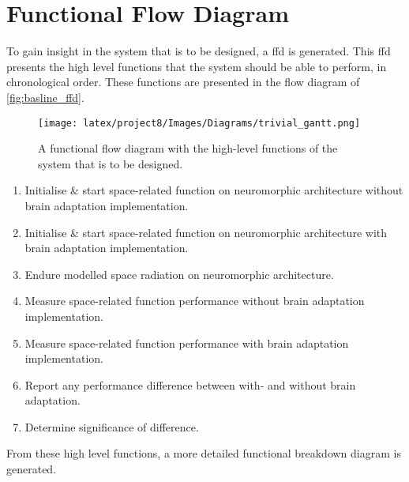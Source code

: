 \chapter{Functional Flow Diagram}\label{chap:baseline_ffd}
To gain insight in the system that is to be designed, a \acrlong{ffd} is generated. This \acrshort{ffd} presents the high level functions that the system should be able to perform, in chronological order. These functions are presented in the flow diagram of \cref{fig:basline_ffd}. 

\begin{figure}[H]
    \centering
    \texttt{[image: latex/project8/Images/Diagrams/trivial\_gantt.png]}
    \caption{A functional flow diagram with the high-level functions of the system that is to be designed.}
    \label{fig:baseline_ffd}
\end{figure}

\begin{enumerate}
    \item Initialise \& start space-related function on neuromorphic architecture without brain adaptation implementation.
    \item Initialise \& start space-related function on neuromorphic architecture with brain adaptation implementation.
    \item Endure modelled space radiation on neuromorphic architecture.
    \item Measure space-related function performance without brain adaptation implementation.
    \item Measure space-related function performance with brain adaptation implementation.
    \item Report any performance difference between with- and without brain adaptation.
    \item Determine significance of difference.
\end{enumerate}

From these high level functions, a more detailed functional breakdown diagram is generated.

